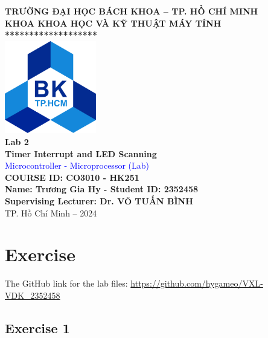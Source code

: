 \documentclass[a4paper,12pt]{article}
\begin{document}

\begin{mdframed}[style=MyFrame]
\thispagestyle{empty}
\begin{center}
    \vspace*{0.5cm}
    {\large \textbf{TRƯỜNG ĐẠI HỌC BÁCH KHOA – TP. HỒ CHÍ MINH}}\\[0.2cm]
    {\large \textbf{KHOA KHOA HỌC VÀ KỸ THUẬT MÁY TÍNH}}\\[0.5cm]
    \textbf{*******************}\\[1cm]

    \includegraphics[width=0.3\textwidth]{bk_logo.png}\\[2cm]

    {\LARGE \textbf{Lab 2}}\\[0.5cm]
    {\LARGE \textbf{Timer Interrupt and LED Scanning}}\\[0.5cm]
    {\LARGE \textcolor{blue}{Microcontroller - Microprocessor (Lab)}}\\[0.5cm]
    {\LARGE \textbf{COURSE ID: CO3010 - HK251}}\\[0.5cm]
    \textbf{\large Name: Trương Gia Hy   -   Student ID: 2352458}\\[0.5cm]
    \textbf{\large Supervising Lecturer: Dr. VÕ TUẤN BÌNH}\\[7.0cm]

    {\large TP. Hồ Chí Minh – 2024}
\end{center}
\end{mdframed}

\newpage
\section{Exercise}
The GitHub link for the lab files:
\textcolor{blue}{\url{https://github.com/hygameo/VXL-VDK_2352458}}
\subsection{Exercise 1}
\end{document}
